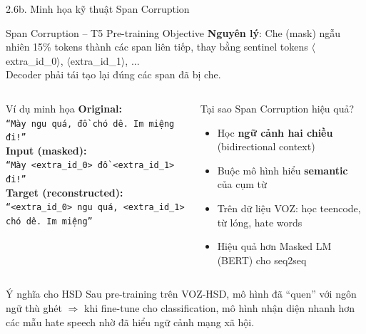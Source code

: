\documentclass[11pt, aspectratio=169]{beamer}
\begin{document}
\begin{frame}[shrink=8]{2.6b. Minh họa kỹ thuật Span Corruption}

\begin{block}{Span Corruption -- T5 Pre-training Objective}
  \textbf{Nguyên lý}: Che (mask) ngẫu nhiên 15\% tokens thành các span liên tiếp, thay bằng sentinel tokens $\langle$extra\_id\_0$\rangle$, $\langle$extra\_id\_1$\rangle$, ...\\ Decoder phải tái tạo lại đúng các span đã bị che.
\end{block}

\vspace{0.2cm}
\begin{columns}[T]
  \begin{block}{Ví dụ minh họa}
    \scriptsize
    \textbf{Original:}\\
    \texttt{``Mày ngu quá, đồ chó dê. Im miệng đi!''}\\[0.3em]
    \textbf{Input (masked):}\\
    \texttt{``Mày <extra\_id\_0> đồ <extra\_id\_1> đi!''}\\[0.3em]
    \textbf{Target (reconstructed):}\\
    \texttt{``<extra\_id\_0> ngu quá, <extra\_id\_1> chó dê. Im miệng''}
  \end{block}

  \begin{block}{Tại sao Span Corruption hiệu quả?}
    \begin{itemize}
      \item Học \textbf{ngữ cảnh hai chiều} (bidirectional context)
      \item Buộc mô hình hiểu \textbf{semantic} của cụm từ
      \item Trên dữ liệu VOZ: học teencode, từ lóng, hate words
      \item Hiệu quả hơn Masked LM (BERT) cho seq2seq
    \end{itemize}
  \end{block}
\end{columns}

\vspace{0.2cm}
\begin{block}{Ý nghĩa cho HSD}
  Sau pre-training trên VOZ-HSD, mô hình đã ``quen'' với ngôn ngữ thù ghét $\Rightarrow$ khi fine-tune cho classification, mô hình nhận diện nhanh hơn các mẫu hate speech nhờ đã hiểu ngữ cảnh mạng xã hội.
\end{block}
\end{frame}
\end{document}
